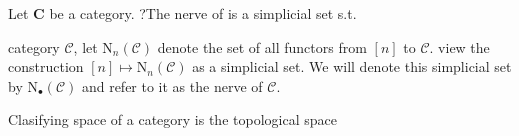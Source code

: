 

\begin{definition}
    Let \(\mathbf{C}\) be a category. ?The nerve of is a simplicial set s.t.

    category \(\mathcal{C}\),  let \(\mathrm{N}_n(\mathcal{C})\) denote the set of all functors from \([n]\) to \(\mathcal{C}\). view the construction \([n] \mapsto \mathrm{N}_n(\mathcal{C})\) as a simplicial set. We will denote this simplicial set by \(\mathrm{N}_{\bullet}(\mathcal{C})\) and refer to it as the nerve of \(\mathcal{C}\).
\end{definition}



Clasifying space of a category is the topological space











